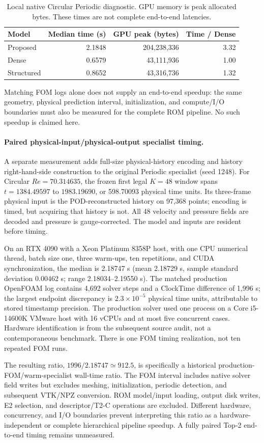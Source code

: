 \begin{table}[H]
\centering
\caption{Local native Circular Periodic diagnostic. GPU memory is peak
allocated bytes. These times are not complete end-to-end latencies.}
\label{tab:local_latency}
\small
\begin{tabular}{@{}lrrr@{}}
\toprule
Model & Median time (s) & GPU peak (bytes) & Time / Dense\\
\midrule
Proposed & 2.1848 & 204,238,336 & 3.32\\
Dense & 0.6579 & 43,111,936 & 1.00\\
Structured & 0.8652 & 43,316,736 & 1.32\\
\bottomrule
\end{tabular}
\end{table}

Matching FOM logs alone does not supply an end-to-end speedup: the same
geometry, physical prediction interval, initialization, and compute/I/O
boundaries must also be measured for the complete ROM pipeline. No such
speedup is claimed here.

\paragraph{Paired physical-input/physical-output specialist timing.}
A separate measurement adds full-size physical-history encoding and
history right-hand-side construction to the original Periodic specialist
(seed 1248). For Circular $Re=70.314635$, the frozen first legal $K=48$
window spans $t=1384.49597$ to $1983.19690$, or 598.70093 physical time
units. Its three-frame physical input is the POD-reconstructed history
on 97,368 points; encoding is timed, but acquiring that history is not.
All 48 velocity and pressure fields are decoded and pressure is
gauge-corrected. The model and inputs are resident before timing.

On an RTX 4090 with a Xeon Platinum 8358P host, with one CPU numerical
thread, batch size one, three warm-ups, ten repetitions, and CUDA
synchronization, the median is 2.18747 s (mean 2.18729 s, sample standard
deviation 0.00462 s; range 2.18034--2.19550 s). The matched production
OpenFOAM log contains 4,692 solver steps and a ClockTime difference of
1,996 s; the largest endpoint discrepancy is $2.3\times10^{-5}$ physical
time units, attributable to stored timestamp precision. The production
solver used one process on a Core i5-14600K VMware host with 16 vCPUs and
at most five concurrent cases. Hardware identification is from the
subsequent source audit, not a contemporaneous benchmark. There is one
FOM timing realization, not ten repeated FOM runs.

The resulting ratio, $1996/2.18747\simeq912.5$, is specifically a historical
production-FOM/warm-specialist wall-time ratio. The FOM interval includes
native solver field writes but excludes meshing, initialization, periodic
detection, and subsequent VTK/NPZ conversion. ROM model/input loading,
output disk writes, E2 selection, and descriptor/T2-C operations are
excluded. Different hardware, concurrency, and I/O boundaries prevent
interpreting this ratio as a hardware-independent or complete hierarchical
pipeline speedup. A fully paired Top-2 end-to-end timing remains unmeasured.
